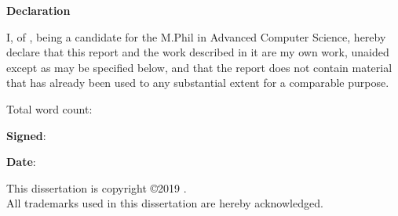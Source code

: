 \newpage
{\Huge \bf Declaration}

\vspace{24pt} 

I, \authorname of \authorcollege, being a candidate for the M.Phil in
Advanced Computer Science, hereby declare that this report and the
work described in it are my own work, unaided except as may be
specified below, and that the report does not contain material that
has already been used to any substantial extent for a comparable
purpose.

\vspace{24pt}
Total word count: \wordcount

\vspace{60pt}
\textbf{Signed}: 

\vspace{12pt}
\textbf{Date}:


\vfill

This dissertation is copyright \copyright 2019 \authorname. 
\\
All trademarks used in this dissertation are hereby acknowledged.



\newpage
\vspace*{\fill}
